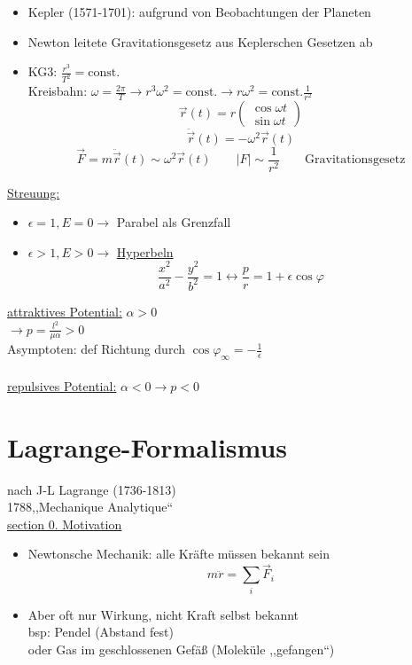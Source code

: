 \documentclass[titlepage,12pt,a4paper,ngerman]{report}
\newcommand{\tx}[1]{\textrm{#1}}
\begin{document}
\begin{itemize}
	\item Kepler (1571-1701): aufgrund von Beobachtungen der Planeten
	\item Newton leitete Gravitationsgesetz aus Keplerschen Gesetzen ab
	\item  KG3: $ \frac{r^3}{T^2} = \tx{const.} $\\
	Kreisbahn: $ \omega = \frac{2\pi}{T}  \rightarrow r^3 \omega^2 = \tx{const.} \rightarrow r \omega^2 = \tx{const.} \frac{1}{r^2}$
	$$\vec{r}(t) = r \begin{pmatrix}
	\cos \omega t \\
	\sin \omega t
	\end{pmatrix}$$
	$$\ddot{\vec{r}} (t) = - \omega^2 \vec{r}(t)$$
	$$\vec{F} = m \ddot{\vec{r}} (t) \sim \omega^2 \vec{r}(t) \qquad |F| \sim \frac{1}{r^2} \qquad \tx{Gravitationsgesetz}$$
\end{itemize}

\underline{Streuung:}
\begin{itemize}
	\item $ \epsilon = 1, E = 0 \rightarrow $ Parabel als Grenzfall
	\item $ \epsilon > 1, E > 0 \rightarrow $ \underline{Hyperbeln}
	$$\frac{x^2}{a^2} - \frac{y^2}{b^2} = 1 \leftrightarrow \frac{p}{r} = 1 + \epsilon \cos \varphi$$
\end{itemize}
\underline{attraktives Potential:} $ \alpha > 0 $\\
$ \rightarrow p = \frac{l^2}{\mu \alpha} > 0 $\\
Asymptoten: def Richtung durch $ \cos \varphi_\infty = -\frac{1}{\epsilon} $\\\\
\underline{repulsives Potential:} $ \alpha < 0 \rightarrow p < 0 $\\


\chapter{Lagrange-Formalismus}
nach J-L Lagrange (1736-1813)\\
1788,,Mechanique Analytique``\\
\underline{\underline{section 0. Motivation}}
\begin{itemize}
	\item Newtonsche Mechanik: alle Kräfte müssen bekannt sein
	$$ m\ddot{r} = \sum_i \vec{F}_i$$
	\item Aber oft nur Wirkung, nicht Kraft selbst bekannt\\
	bsp: Pendel (Abstand fest) \\
	oder Gas im geschlossenen Gefäß (Moleküle ,,gefangen``)
\end{itemize}
\end{document}
